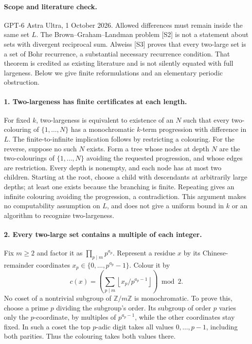 \documentclass[11pt,a4paper]{article}
\begin{document}
\paragraph{Scope and literature check.}
GPT-6 Astra Ultra, 1 October 2026. Allowed differences must remain
inside the same set $L$. The Brown--Graham--Landman problem [S2]
is not a statement about sets with divergent reciprocal sum.
Alweiss [S3] proves that every two-large set is a set of Bohr recurrence,
a substantial necessary recurrence condition. That theorem is credited
as existing literature and is not silently equated with full largeness.
Below we give finite reformulations and an elementary periodic obstruction.

\paragraph{1. Two-largeness has finite certificates at each length.}
For fixed $k$, two-largeness is equivalent to existence of an $N$ such
that every two-colouring of $\{1,\ldots,N\}$ has a monochromatic
$k$-term progression with difference in $L$. The finite-to-infinite
implication follows by restricting a colouring. For the reverse, suppose
no such $N$ exists. Form a tree whose nodes at depth $N$ are the
two-colourings of $\{1,\ldots,N\}$ avoiding the requested progression,
and whose edges are restriction. Every depth is nonempty, and each
node has at most two children. Starting at the root, choose a child
with descendants at arbitrarily large depths; at least one exists
because the branching is finite. Repeating gives an infinite colouring
avoiding the progression, a contradiction.
This argument makes no computability assumption on $L$, and does not
give a uniform bound in $k$ or an algorithm to recognize two-largeness.

\paragraph{2. Every two-large set contains a multiple of each integer.}
Fix $m\ge2$ and factor it as $\prod_{p\mid m}p^{a_p}$. Represent
a residue $x$ by its Chinese-remainder coordinates
$x_p\in\{0,\ldots,p^{a_p}-1\}$. Colour it by
\[
 c(x)=\left(\sum_{p\mid m}
 \left\lfloor x_p/p^{a_p-1}\right\rfloor\right)\bmod2.
\]
No coset of a nontrivial subgroup of $\mathbb Z/m\mathbb Z$ is
monochromatic. To prove this, choose a prime $p$ dividing the subgroup's
order. Its subgroup of order $p$ varies only the $p$-coordinate,
by multiples of $p^{a_p-1}$, while the other coordinates stay fixed.
In such a coset the top $p$-adic digit takes all values $0,\ldots,p-1$,
including both parities. Thus the colouring takes both values there.
\end{document}
